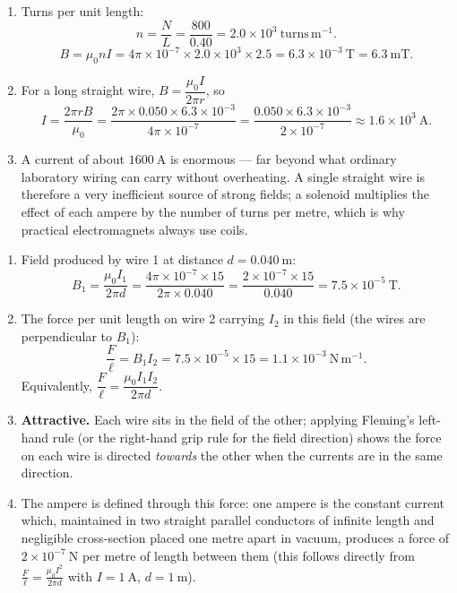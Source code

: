 \documentclass[11pt]{article}
\begin{document}
\begin{corrige}
\begin{enumerate}
\item Turns per unit length:
\[ n = \frac{N}{L} = \frac{800}{0.40} = 2.0 \times 10^{3}\ \mathrm{turns\,m^{-1}}. \]
\[ B = \mu_0 n I = 4\pi \times 10^{-7} \times 2.0 \times 10^{3} \times 2.5 = 6.3 \times 10^{-3}\ \mathrm{T} = 6.3\ \mathrm{mT}. \]
\item For a long straight wire, $B = \dfrac{\mu_0 I}{2\pi r}$, so
\[ I = \frac{2\pi r B}{\mu_0} = \frac{2\pi \times 0.050 \times 6.3 \times 10^{-3}}{4\pi \times 10^{-7}} = \frac{0.050 \times 6.3 \times 10^{-3}}{2 \times 10^{-7}} \approx 1.6 \times 10^{3}\ \mathrm{A}. \]
\item A current of about $1600\ \mathrm{A}$ is enormous --- far beyond what ordinary laboratory wiring can carry without overheating. A single straight wire is therefore a very inefficient source of strong fields; a solenoid multiplies the effect of each ampere by the number of turns per metre, which is why practical electromagnets always use coils.
\end{enumerate}
\end{corrige}

\begin{corrige}
\begin{enumerate}
\item Field produced by wire 1 at distance $d = 0.040\ \mathrm{m}$:
\[ B_1 = \frac{\mu_0 I_1}{2\pi d} = \frac{4\pi \times 10^{-7} \times 15}{2\pi \times 0.040} = \frac{2 \times 10^{-7} \times 15}{0.040} = 7.5 \times 10^{-5}\ \mathrm{T}. \]
\item The force per unit length on wire 2 carrying $I_2$ in this field (the wires are perpendicular to $B_1$):
\[ \frac{F}{\ell} = B_1 I_2 = 7.5 \times 10^{-5} \times 15 = 1.1 \times 10^{-3}\ \mathrm{N\,m^{-1}}. \]
Equivalently, $\dfrac{F}{\ell} = \dfrac{\mu_0 I_1 I_2}{2\pi d}$.
\item \textbf{Attractive.} Each wire sits in the field of the other; applying Fleming's left-hand rule (or the right-hand grip rule for the field direction) shows the force on each wire is directed \emph{towards} the other when the currents are in the same direction.
\item The ampere is defined through this force: one ampere is the constant current which, maintained in two straight parallel conductors of infinite length and negligible cross-section placed one metre apart in vacuum, produces a force of $2 \times 10^{-7}\ \mathrm{N}$ per metre of length between them (this follows directly from $\frac{F}{\ell} = \frac{\mu_0 I^2}{2\pi d}$ with $I = 1\ \mathrm{A}$, $d = 1\ \mathrm{m}$).
\end{enumerate}
\end{corrige}
\end{document}

